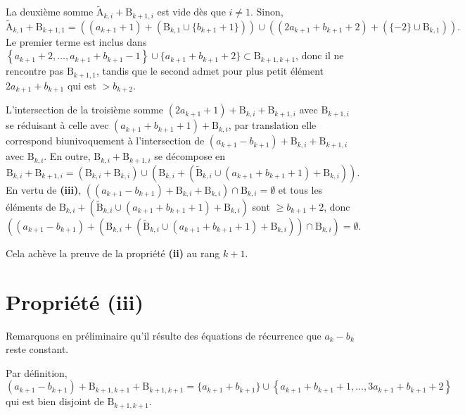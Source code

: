 \documentclass[11pt, oneside]{article}   	%
\newcommand{\interval}[2]{\left\{ #1, \dots, #2 \right\}}
\begin{document}
La deuxième somme $\widetilde{\mathrm{A}}_{k, i} + \mathrm{B}_{k + 1, i}$ est vide dès que $i \neq 1$.
Sinon,
\begin{equation}
 \widetilde{\mathrm{A}}_{k, 1} + \mathrm{B}_{k + 1, 1} = ((a_{k+1} + 1) + (\mathrm{B}_{k, 1} \cup \{b_{k + 1} + 1\})) \cup
  ((2 a_{k+1} + b_{k+1} + 2) + (\{- 2\} \cup \mathrm{B}_{k, 1})).
\end{equation}
Le premier terme est inclus dans $\interval{a_{k+1} + 2}{a_{k+1} + b_{k+1} - 1} \cup \{a_{k+1} + b_{k+1} + 2\} \subset \mathrm{B}_{k + 1, k + 1}$,
donc il ne rencontre pas $\mathrm{B}_{k + 1, 1}$,
tandis que le second admet pour plus petit élément $2 a_{k+1} + b_{k+1}$ qui est $> b_{k + 2}$.


L'intersection de la troisième somme $(2 a_{k+1} + 1) + \mathrm{B}_{k, i} + \mathrm{B}_{k + 1, i}$ avec $\mathrm{B}_{k + 1, i}$
se réduisant à celle avec $(a_{k+1} + b_{k+1} + 1) + \mathrm{B}_{k, i}$, par translation
elle correspond biunivoquement à l'intersection de $(a_{k+1} - b_{k+1}) + \mathrm{B}_{k, i} + \mathrm{B}_{k + 1, i}$ avec $\mathrm{B}_{k, i}$.
En outre, $\mathrm{B}_{k, i} + \mathrm{B}_{k + 1, i}$ se décompose en
\begin{equation}
 \mathrm{B}_{k, i} + \mathrm{B}_{k + 1, i} = (\mathrm{B}_{k, i} + \mathrm{B}_{k, i}) \cup
 (\mathrm{B}_{k, i} + (\widetilde{\mathrm{B}}_{k, i} \cup (a_{k+1} + b_{k+1} + 1) + \mathrm{B}_{k, i})).
\end{equation}
En vertu de \textbf{(iii)}, $((a_{k+1} - b_{k+1}) + \mathrm{B}_{k, i} + \mathrm{B}_{k, i}) \cap \mathrm{B}_{k, i} = \emptyset$
et tous les éléments de $\mathrm{B}_{k, i} + (\widetilde{\mathrm{B}}_{k, i} \cup (a_{k+1} + b_{k+1} + 1) + \mathrm{B}_{k, i})$
sont $\geqslant b_{k+1} + 2$, donc
\begin{equation}
 \left( (a_{k+1} - b_{k+1}) + (\mathrm{B}_{k, i} + (\widetilde{\mathrm{B}}_{k, i} \cup (a_{k+1} + b_{k+1} + 1) + \mathrm{B}_{k, i})) \cap \mathrm{B}_{k, i} \right) = \emptyset.
\end{equation}

Cela achève la preuve de la propriété \textbf{(ii)} au rang $k+1$.

\section{Propriété (iii)}

Remarquons en préliminaire qu'il résulte des équations de récurrence que $a_k - b_k$ reste constant.

Par définition,
\begin{equation}
 (a_{k+1} - b_{k+1}) + \mathrm{B}_{k + 1, k + 1} + \mathrm{B}_{k + 1, k + 1} = \{ a_{k+1} + b_{k+1} \} \cup \interval{a_{k+1} + b_{k+1} + 1}{3 a_{k+1} + b_{k+1} + 2}
\end{equation}
qui est bien disjoint de $\mathrm{B}_{k + 1, k + 1}$.
\end{document}
